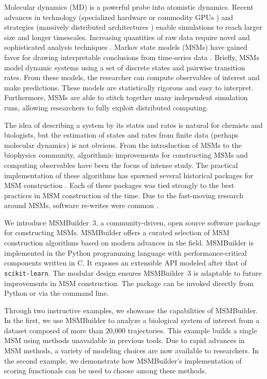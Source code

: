 Molecular dynamics (MD) is a powerful probe into atomistic dynamics. Recent
advances in technology (specialized hardware \cite{2008-anton} or commodity
GPUs \cite{2009-friedrichs-gpu}) and strategies (massively distributed
architectures \cite{2000-fah, 2010-gpugrid, 2014-kohlhoff-exacycle}) enable
simulations to reach larger size and longer timescales. Increasing
quantities of raw data require novel and sophisticated analysis techniques
\cite{2014-msm-perspective}. Markov state models (MSMs) have gained favor
for drawing interpretable conclusions from time-series data
\cite{2010-everything-msm-afraid-ask, 2014-msm-perspective,
2014-chodera-msm, 2014-msm-book}. Briefly, MSMs model dynamic systems using
a set of discrete states and pairwise transition rates. From these models,
the researcher can compute observables of interest and make predictions.
These models are statistically rigorous and easy to
interpret. Furthermore, MSMs are able to stitch together many
independent simulation runs, allowing researchers to fully exploit
distributed computing.

The idea of describing a system by its states and rates is natural for
chemists and biologists, but the estimation of states and rates from finite
data (perhaps molecular dynamics) is not obvious. From the introduction of
MSMs to the biophysics community, algorithmic improvements for constructing
MSMs and computing observables have been the focus of intense study. The
practical implementation of these algorithms has spawned several historical
packages for MSM construction \cite{2009-msmbuilder1, 2011-msmbuilder2,
2012-jemma}. Each of these packages was tied strongly to the best
practices in MSM construction of the time. Due to the fast-moving research
around MSMs, software re-writes were common \cite{2015-pyemma, 2016-htmd}.

We introduce MSMBuilder~3, a community-driven, open source software package
for constructing MSMs. MSMBuilder offers a curated selection of MSM
construction algorithms based on modern advances in the field. MSMBuilder
is implemented in the Python programming language with performance-critical
components written in C. It exposes an extensible API modeled after that of
\texttt{scikit-learn}. The modular design ensures MSMBuilder~3 is adaptable
to future improvements in MSM construction. The package can be invoked
directly from Python or via the command line.

Through two instructive examples, we showcase the capabilities
of MSMBuilder. In the first, we use MSMBuilder to analyze a biological
system of interest from a dataset composed of more than 20,000
trajectories. This example builds a single MSM using methods
unavailable in previous tools.
Due to rapid advances in MSM methods,
a variety of modeling choices are now available to researchers. 
In the second example, we demonstrate how MSMBuilder's
implementation of scoring functionals
can be used to choose among these methods.

